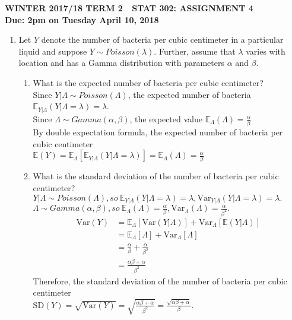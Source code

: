 \documentclass[11pt]{article}
\newcommand{\e}{\mathbb{E}}
\newcommand{\var}{\text{Var}}
\newcommand{\sd}{\text{SD}}
\begin{document}
\begin{center}
\textbf{WINTER 2017/18 TERM 2  \,\, STAT 302: ASSIGNMENT 4 \\
Due: 2pm on Tuesday April 10, 2018}
\end{center}


\begin{enumerate}[label=\textbf{Question \arabic*:},start=1]


\item
Let $Y$ denote the number of bacteria per cubic centimeter in a particular liquid and suppose $Y\sim Poisson(\lambda)$. Further, assume that $\lambda$ varies with location and has a Gamma distribution with parameters $\alpha$ and $\beta$.
\begin{enumerate}
	\item What is the expected number of bacteria per cubic centimeter?\\
	
	Since $Y|\Lambda \sim Poisson(\Lambda)$, the expected number of bacteria $\e_{Y|\Lambda}{(Y|\Lambda = \lambda)} = \lambda$.\\
	Since $\Lambda \sim Gamma(\alpha, \beta)$, the expected value $\e_{\Lambda}{(\Lambda)} = \frac{\alpha}{\beta}$ \\
	By double expectation formula, the expected number of bacteria per cubic centimeter \\
	$\e(Y) = \e_{\Lambda}[\e_{Y|\Lambda}(Y|\Lambda = \lambda)] = \e_{\Lambda}(\Lambda) = \frac{\alpha}{\beta}$\\

	\item What is the standard deviation of the number of bacteria per cubic centimeter?\\
	
	$Y|\Lambda \sim Poisson(\Lambda), so \ \e_{Y|\Lambda}(Y|\Lambda = \lambda) = \lambda, \var_{Y|\Lambda}(Y|\Lambda = \lambda) = \lambda.$ \\
	$\Lambda \sim Gamma(\alpha, \beta), so \ \e_{\Lambda}(\Lambda) = \frac{\alpha}{\beta}, \var_{\Lambda}(\Lambda) = \frac{\alpha}{\beta^2}.$
	\begin{align*}
	\var(Y) & = \e_{\Lambda}[\var(Y|\Lambda)] + \var_{\Lambda}[\e(Y|\Lambda)] \\
	& = \e_{\Lambda}[\Lambda] + \var_{\Lambda}[\Lambda] \\
	& = \frac{\alpha}{\beta} + \frac{\alpha}{\beta^2} \\
	& = \frac{\alpha \beta + \alpha}{\beta^2}
	\end{align*}
	Therefore, the standard deviation of the number of bacteria per cubic centimeter\\ $\sd(Y) = \sqrt{\var(Y)} = \sqrt{\frac{\alpha \beta + \alpha}{\beta^2}} = \frac{\sqrt{\alpha \beta + \alpha}}{\beta}$.\\


\end{enumerate}
\end{enumerate}
\end{document}
